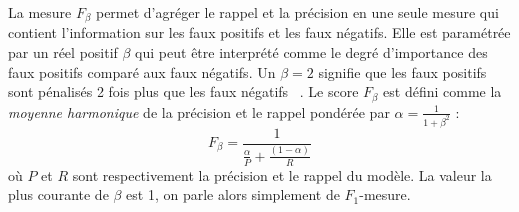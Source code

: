 La mesure \(F_\beta\) permet d'agréger le rappel et la précision en une seule mesure
qui contient l'information sur les faux positifs et les faux négatifs.
Elle est paramétrée par un réel positif \(\beta\) 
qui peut être interprété comme le degré d'importance des faux positifs comparé aux faux négatifs.
Un \(\beta = 2\) signifie que les faux positifs sont pénalisés 2 fois plus que les faux négatifs%
~\cite{books/bu/Rijsbergen79}.
Le score \(F_\beta\) est défini comme la \emph{moyenne harmonique} de la précision et le rappel
pondérée par \(\alpha = \frac{1}{1 + \beta^2}\) :
\begin{equation}
    \label{eq.fbeta}
    F_\beta = \frac{1}{\frac{\alpha}{P} + \frac{(1 - \alpha)}{R}}
\end{equation}
où \(P\) et \(R\) sont respectivement la précision et le rappel du modèle.
La valeur la plus courante de \(\beta\) est 1,
on parle alors simplement de \(F_1\)-mesure.



